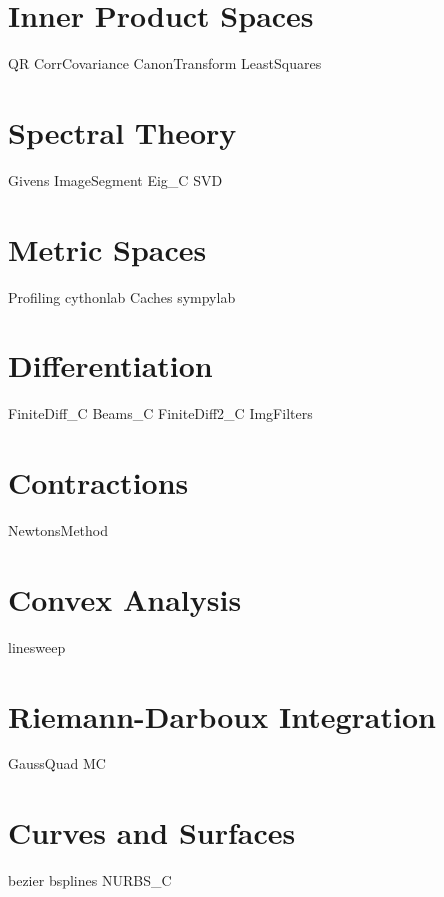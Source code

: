 \documentclass[nociteref]{newsiambook}
\begin{document}
\part{Inner Product Spaces}
{QR}
{CorrCovariance}
{CanonTransform}
{LeastSquares}

\part{Spectral Theory}
{Givens}
{ImageSegment}
{Eig_C}
{SVD}

\part{Metric Spaces}
{Profiling}
{cythonlab}
{Caches}
{sympylab}

\part{Differentiation}
{FiniteDiff_C}
{Beams_C}
{FiniteDiff2_C}
{ImgFilters}

\part{Contractions}
{NewtonsMethod}

\part{Convex Analysis}
{linesweep}

\part{Riemann-Darboux Integration}
{GaussQuad}
{MC}

\part{Curves and Surfaces}
{bezier}
{bsplines}
{NURBS_C}
\end{document}
